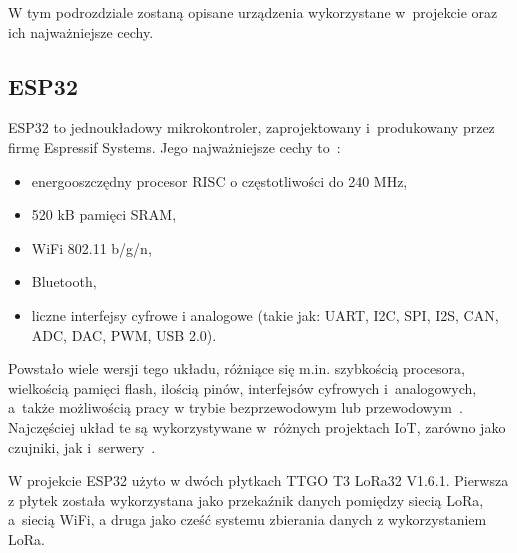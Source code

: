 W tym podrozdziale zostaną opisane urządzenia wykorzystane w~projekcie oraz ich najważniejsze cechy.

\subsection{ESP32}
ESP32 to jednoukładowy mikrokontroler, zaprojektowany i~produkowany przez firmę Espressif Systems.
Jego najważniejsze cechy to~\cite{ESP32:datasheet}:
\begin{itemize}
    \item energooszczędny procesor RISC o częstotliwości do 240 MHz,
    \item 520 kB pamięci SRAM,
    \item WiFi 802.11 b/g/n,
    \item Bluetooth,
    \item liczne interfejsy cyfrowe i analogowe (takie jak: UART, I2C, SPI, I2S, CAN, ADC, DAC, PWM, USB 2.0).
\end{itemize}

Powstało wiele wersji tego układu, różniące się m.in. szybkością procesora, wielkością pamięci flash, ilością pinów, interfejsów cyfrowych i~analogowych, a~także możliwością pracy w trybie bezprzewodowym lub przewodowym~\cite{ESP32:socs}.
Najczęściej układ te są wykorzystywane w~różnych projektach IoT, zarówno jako czujniki, jak i~serwery~\cite{ESP32:datasheet}.


W projekcie ESP32 użyto w dwóch płytkach TTGO T3 LoRa32 V1.6.1.
Pierwsza z płytek została wykorzystana jako przekaźnik danych pomiędzy siecią LoRa, a~siecią WiFi, a druga jako cześć systemu zbierania danych z wykorzystaniem LoRa.


